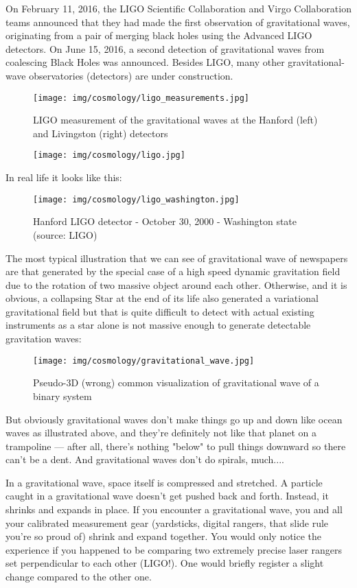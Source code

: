 	On February 11, 2016, the LIGO Scientific Collaboration and Virgo Collaboration teams announced that they had made the first observation of gravitational waves, originating from a pair of merging black holes using the Advanced LIGO detectors. On June 15, 2016, a second detection of gravitational waves from coalescing Black Holes was announced. Besides LIGO, many other gravitational-wave observatories (detectors) are under construction.
	\begin{figure}[H]
		\centering
		\texttt{[image: img/cosmology/ligo\_measurements.jpg]}	
		\caption{LIGO measurement of the gravitational waves at the Hanford (left) and Livingston (right) detectors}
	\end{figure}
	\begin{figure}[H]
		\centering
		\texttt{[image: img/cosmology/ligo.jpg]}
	\end{figure}
	In real life it looks like this:
	\begin{figure}[H]
		\centering
		\texttt{[image: img/cosmology/ligo\_washington.jpg]}
		\caption[Hanford LIGO detector Washington state (source: LIGO)]{Hanford LIGO detector - October 30, 2000 - Washington state (source: LIGO)}
	\end{figure}
	The most typical illustration that we can see of gravitational wave of newspapers are that generated by the special case of a high speed dynamic gravitation field due to the rotation of two massive object around each other. Otherwise, and it is obvious, a collapsing Star at the end of its life also generated a variational gravitational field but that is quite difficult to detect with actual existing instruments as a star alone is not massive enough to generate detectable gravitation waves:
	\begin{figure}[H]
		\centering
		\texttt{[image: img/cosmology/gravitational\_wave.jpg]}	
		\caption{Pseudo-3D (wrong) common visualization of gravitational wave of a binary system}
	\end{figure}
	But obviously gravitational waves don't make things go up and down like ocean waves as illustrated above, and they're definitely not like that planet on a trampoline — after all, there's nothing "below" to pull things downward so there can't be a dent.  And gravitational waves don't do spirals, much....
	
	In a gravitational wave, space itself is compressed and stretched.  A particle caught in a gravitational wave doesn't get pushed back and forth.  Instead, it shrinks and expands in place.  If you encounter a gravitational wave, you and all your calibrated measurement gear (yardsticks, digital rangers, that slide rule you’re so proud of) shrink and expand together.  You would only notice the experience if you happened to be comparing two extremely precise laser rangers set perpendicular to each other (LIGO!).  One would briefly register a slight change compared to the other one.
	
